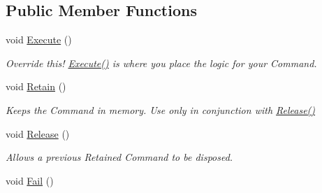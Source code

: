 \subsection*{Public Member Functions}
\begin{DoxyCompactItemize}
\item 
\hypertarget{interfacestrange_1_1extensions_1_1command_1_1api_1_1_i_command_a49ddf3bbaf19624534fa99fa4725feca}{void \hyperlink{interfacestrange_1_1extensions_1_1command_1_1api_1_1_i_command_a49ddf3bbaf19624534fa99fa4725feca}{Execute} ()}\label{interfacestrange_1_1extensions_1_1command_1_1api_1_1_i_command_a49ddf3bbaf19624534fa99fa4725feca}

\begin{DoxyCompactList}\small\item\em Override this! {\ttfamily \hyperlink{interfacestrange_1_1extensions_1_1command_1_1api_1_1_i_command_a49ddf3bbaf19624534fa99fa4725feca}{Execute()}} is where you place the logic for your Command. \end{DoxyCompactList}\item 
\hypertarget{interfacestrange_1_1extensions_1_1command_1_1api_1_1_i_command_ae24532aa617e2bee62a3798b59b78458}{void \hyperlink{interfacestrange_1_1extensions_1_1command_1_1api_1_1_i_command_ae24532aa617e2bee62a3798b59b78458}{Retain} ()}\label{interfacestrange_1_1extensions_1_1command_1_1api_1_1_i_command_ae24532aa617e2bee62a3798b59b78458}

\begin{DoxyCompactList}\small\item\em Keeps the Command in memory. Use only in conjunction with {\ttfamily \hyperlink{interfacestrange_1_1extensions_1_1command_1_1api_1_1_i_command_a462054fd8e17e6139f9739e32d4d6ced}{Release()}} \end{DoxyCompactList}\item 
\hypertarget{interfacestrange_1_1extensions_1_1command_1_1api_1_1_i_command_a462054fd8e17e6139f9739e32d4d6ced}{void \hyperlink{interfacestrange_1_1extensions_1_1command_1_1api_1_1_i_command_a462054fd8e17e6139f9739e32d4d6ced}{Release} ()}\label{interfacestrange_1_1extensions_1_1command_1_1api_1_1_i_command_a462054fd8e17e6139f9739e32d4d6ced}

\begin{DoxyCompactList}\small\item\em Allows a previous Retained Command to be disposed. \end{DoxyCompactList}\item 
\hypertarget{interfacestrange_1_1extensions_1_1command_1_1api_1_1_i_command_a1ad585b6fcc3e4dad5823100a62d9053}{void \hyperlink{interfacestrange_1_1extensions_1_1command_1_1api_1_1_i_command_a1ad585b6fcc3e4dad5823100a62d9053}{Fail} ()}\label{interfacestrange_1_1extensions_1_1command_1_1api_1_1_i_command_a1ad585b6fcc3e4dad5823100a62d9053}


\end{DoxyCompactItemize}
